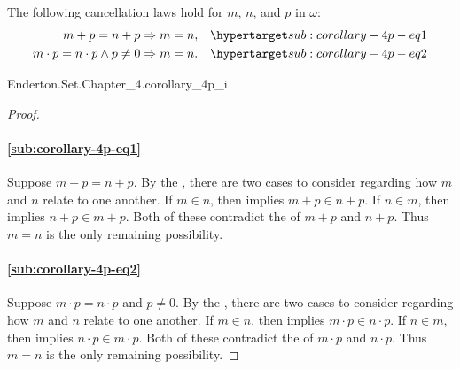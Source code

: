 \documentclass{report}
\begin{document}
\subsection{}%

  \begin{corollary}[4P]
    The following cancellation laws hold for $m$, $n$, and $p$ in $\omega$:
      \begin{align}
        m + p = n + p & \Rightarrow m = n,
          & \hyperlabel{sub:corollary-4p-eq1} \\
        m \cdot p = n \cdot p \land p \neq 0 & \Rightarrow m = n.
          & \hyperlabel{sub:corollary-4p-eq2}
      \end{align}
  \end{corollary}

    {Enderton.Set.Chapter\_4.corollary\_4p\_i}



  \begin{proof}

    \paragraph{\eqref{sub:corollary-4p-eq1}}%

      Suppose $m + p = n + p$.
      By the , there are two
        cases to consider regarding how $m$ and $n$ relate to one another.
      If $m \in n$, then  implies $m + p \in n + p$.
      If $n \in m$, then  implies $n + p \in m + p$.
      Both of these contradict the 
        of $m + p$ and $n + p$.
      Thus $m = n$ is the only remaining possibility.

    \paragraph{\eqref{sub:corollary-4p-eq2}}%

      Suppose $m \cdot p = n \cdot p$ and $p \neq 0$.
      By the , there are two
        cases to consider regarding how $m$ and $n$ relate to one another.
      If $m \in n$, then  implies
        $m \cdot p \in n \cdot p$.
      If $n \in m$, then  implies
        $n \cdot p \in m \cdot p$.
      Both of these contradict the 
        of $m \cdot p$ and $n \cdot p$.
      Thus $m = n$ is the only remaining possibility.

  \end{proof}
\end{document}
